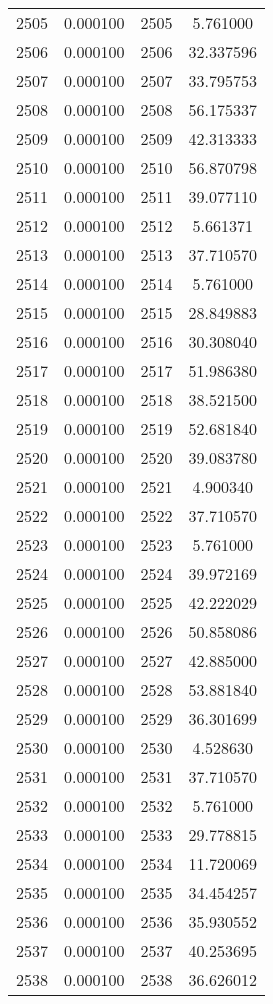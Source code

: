 \documentclass[12pt]{article}
\begin{document}
\begin{longtable}{@{}cccc@{}}
2505 & 0.000100 & 2505 & 5.761000 \\
2506 & 0.000100 & 2506 & 32.337596 \\
2507 & 0.000100 & 2507 & 33.795753 \\
2508 & 0.000100 & 2508 & 56.175337 \\
2509 & 0.000100 & 2509 & 42.313333 \\
2510 & 0.000100 & 2510 & 56.870798 \\
2511 & 0.000100 & 2511 & 39.077110 \\
2512 & 0.000100 & 2512 & 5.661371 \\
2513 & 0.000100 & 2513 & 37.710570 \\
2514 & 0.000100 & 2514 & 5.761000 \\
2515 & 0.000100 & 2515 & 28.849883 \\
2516 & 0.000100 & 2516 & 30.308040 \\
2517 & 0.000100 & 2517 & 51.986380 \\
2518 & 0.000100 & 2518 & 38.521500 \\
2519 & 0.000100 & 2519 & 52.681840 \\
2520 & 0.000100 & 2520 & 39.083780 \\
2521 & 0.000100 & 2521 & 4.900340 \\
2522 & 0.000100 & 2522 & 37.710570 \\
2523 & 0.000100 & 2523 & 5.761000 \\
2524 & 0.000100 & 2524 & 39.972169 \\
2525 & 0.000100 & 2525 & 42.222029 \\
2526 & 0.000100 & 2526 & 50.858086 \\
2527 & 0.000100 & 2527 & 42.885000 \\
2528 & 0.000100 & 2528 & 53.881840 \\
2529 & 0.000100 & 2529 & 36.301699 \\
2530 & 0.000100 & 2530 & 4.528630 \\
2531 & 0.000100 & 2531 & 37.710570 \\
2532 & 0.000100 & 2532 & 5.761000 \\
2533 & 0.000100 & 2533 & 29.778815 \\
2534 & 0.000100 & 2534 & 11.720069 \\
2535 & 0.000100 & 2535 & 34.454257 \\
2536 & 0.000100 & 2536 & 35.930552 \\
2537 & 0.000100 & 2537 & 40.253695 \\
2538 & 0.000100 & 2538 & 36.626012 \\

\end{longtable}
\end{document}
